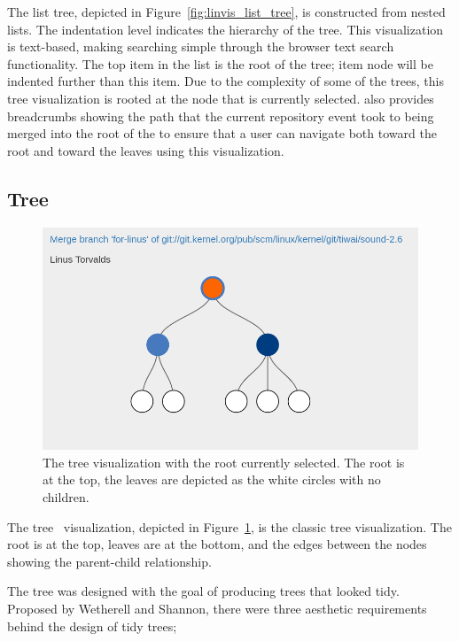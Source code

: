 The list tree, depicted in Figure~\ref{fig:linvis_list_tree}, is
constructed from nested lists. The indentation level indicates the
hierarchy of the tree. This visualization is text-based, making
searching simple through the browser text search functionality. The top
item in the list is the root of the tree; item node will be indented
further than this item. Due to the complexity of some of the trees, this
tree visualization is rooted at the node that is currently selected.
\tool{} also provides breadcrumbs showing the path that the current
repository event took to being merged into the root of the \mt{} to
ensure that a user can navigate both toward the root and toward the
leaves using this visualization.

\subsection{\rt{} Tree}
\label{sub:rt_tree}

\begin{figure}[htpb]
  \centering
  \includegraphics[width=0.9\linewidth]{Figures/Linvis/linvis_reingold_tree.png}
  \caption{The \rt{} tree visualization with the root currently
    selected. The root is at the top, the leaves are depicted as the
    white circles with no children.}
  \label{fig:linvis_reingold_tree}
\end{figure}

The \rt{} tree~\cite{Reingold1981} visualization, depicted in
Figure~\ref{fig:linvis_reingold_tree}, is the classic tree
visualization. The root is at the top, leaves are at the bottom, and the
edges between the nodes showing the parent-child relationship.

The \rt{} tree was designed with the goal of producing trees that looked
tidy. Proposed by Wetherell and Shannon\cite{Wetherell1979}, there were
three aesthetic requirements behind the design of tidy trees;


